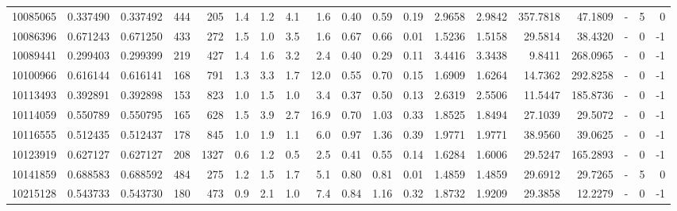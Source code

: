 \begin{tabular}{rrrrrrrrrrrrrrrrlrr}
  10085065 & 0.337490 &   0.337492 &  444 &  205 &      1.4 &      1.2 &     4.1 &      1.6 &       0.40 &        0.59 &        0.19 &  2.9658 &  2.9842 &  357.7818 &   47.1809 &             - &        5 &          0 \\
  10086396 & 0.671243 &   0.671250 &  433 &  272 &      1.5 &      1.0 &     3.5 &      1.6 &       0.67 &        0.66 &        0.01 &  1.5236 &  1.5158 &   29.5814 &   38.4320 &             - &        0 &         -1 \\
  10089441 & 0.299403 &   0.299399 &  219 &  427 &      1.4 &      1.6 &     3.2 &      2.4 &       0.40 &        0.29 &        0.11 &  3.4416 &  3.3438 &    9.8411 &  268.0965 &             - &        0 &         -1 \\
  10100966 & 0.616144 &   0.616141 &  168 &  791 &      1.3 &      3.3 &     1.7 &     12.0 &       0.55 &        0.70 &        0.15 &  1.6909 &  1.6264 &   14.7362 &  292.8258 &             - &        0 &         -1 \\
  10113493 & 0.392891 &   0.392898 &  153 &  823 &      1.0 &      1.5 &     1.0 &      3.4 &       0.37 &        0.50 &        0.13 &  2.6319 &  2.5506 &   11.5447 &  185.8736 &             - &        0 &         -1 \\
  10114059 & 0.550789 &   0.550795 &  165 &  628 &      1.5 &      3.9 &     2.7 &     16.9 &       0.70 &        1.03 &        0.33 &  1.8525 &  1.8494 &   27.1039 &   29.5072 &             - &        0 &         -1 \\
  10116555 & 0.512435 &   0.512437 &  178 &  845 &      1.0 &      1.9 &     1.1 &      6.0 &       0.97 &        1.36 &        0.39 &  1.9771 &  1.9771 &   38.9560 &   39.0625 &             - &        0 &         -1 \\
  10123919 & 0.627127 &   0.627127 &  208 & 1327 &      0.6 &      1.2 &     0.5 &      2.5 &       0.41 &        0.55 &        0.14 &  1.6284 &  1.6006 &   29.5247 &  165.2893 &             - &        0 &         -1 \\
  10141859 & 0.688583 &   0.688592 &  484 &  275 &      1.2 &      1.5 &     1.7 &      5.1 &       0.80 &        0.81 &        0.01 &  1.4859 &  1.4859 &   29.6912 &   29.7265 &             - &        5 &          0 \\
  10215128 & 0.543733 &   0.543730 &  180 &  473 &      0.9 &      2.1 &     1.0 &      7.4 &       0.84 &        1.16 &        0.32 &  1.8732 &  1.9209 &   29.3858 &   12.2279 &             - &        0 &         -1 \\

\end{tabular}
